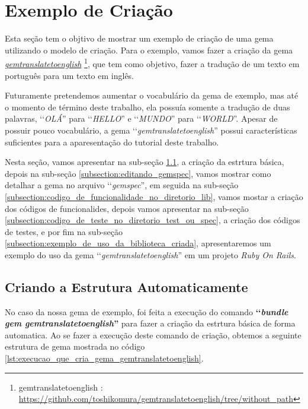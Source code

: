 \section{Exemplo de Criação}
\label{section:exemplo_de_criação}


Esta seção tem o objtivo de mostrar um exemplo de criação de uma gema utilizando o modelo de criação.
Para o exemplo, vamos fazer a criação da gema
\emph{\href{https://github.com/toshikomura/gemtranslatetoenglish/tree/without_path}{gemtranslatetoenglish}}
\footnote{gemtranslatetoenglish : \url{https://github.com/toshikomura/gemtranslatetoenglish/tree/without_path}},
que tem como objetivo, fazer a tradução de um texto em português para um texto em inglês.

Futuramente pretendemos aumentar o vocabulário da gema de exemplo, mas até o momento de término deste
trabalho, ela possuía somente a tradução de duas palavras, ‘‘\emph{OLÁ}'' para ‘‘\emph{HELLO}'' e
‘‘\emph{MUNDO}'' para ‘‘\emph{WORLD}''. Apesar de possuir pouco vocabulário, a gema ‘‘\emph{gemtranslatetoenglish}''
possui características suficientes para a aparesentação do tutorial deste trabalho.

Nesta seção, vamos apresentar na sub-seção \ref{subsection:criando_a_estrutura_automaticamente}, a criação da
estrtura básica, depois na sub-seção \ref{subsection:editando_gemspec}, vamos mostrar como detalhar a gema no
arquivo ‘‘\emph{gemspec}'', em seguida na sub-seção \ref{subsection:codigo_de_funcionalidade_no_diretorio_lib},
vamos mostar a criação dos códigos de funcionalides, depois vamos apresentar na sub-seção
\ref{subsection:codigo_de_teste_no_diretorio_test_ou_spec}, a criação dos códigos de testes, e por fim na
sub-seção \ref{subsection:exemplo_de_uso_da_biblioteca_criada}, apresentaremos um exemplo do uso da gema
‘‘\emph{gemtranslatetoenglish}'' em um projeto \emph{Ruby On Rails}.


\subsection{Criando a Estrutura Automaticamente}
\label{subsection:criando_a_estrutura_automaticamente}


No caso da nossa gema de exemplo, foi feita a execução do comando \textbf{‘‘\emph{bundle gem gemtranslatetoenglish}''}
para fazer a criação da estrtura básica de forma automatica. Ao se fazer a execução deste comando de criação, obtemos
a seguinte estrutura de gema mostrada no código \ref{lst:execucao_que_cria_gema_gemtranslatetoenglish}. 

